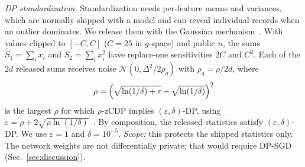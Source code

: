 \textit{DP standardization.} Standardization needs per-feature means and
variances, which are normally shipped with a model and can reveal individual
records when an outlier dominates. We release them with the Gaussian
mechanism~\cite{dwork2014foundations}. With values clipped to $[-C,C]$ ($C=25$ in $g$-space) and public
$n$, the sums $S_1=\sum_i x_i$ and $S_2=\sum_i x_i^2$ have replace-one
sensitivities $2C$ and $C^2$. Each of the $2d$ released sums receives noise
$\mathcal{N}(0,\Delta^2/2\rho_q)$ with $\rho_q=\rho/2d$, where
\begin{equation}
  \rho=\Bigl(\sqrt{\ln(1/\delta)+\varepsilon}-\sqrt{\ln(1/\delta)}\Bigr)^2
  \label{eq:rho}
\end{equation}
is the largest $\rho$ for which $\rho$-zCDP implies
$(\varepsilon,\delta)$-DP, using $\varepsilon=\rho+2\sqrt{\rho\ln(1/\delta)}$~\cite{bun2016zcdp}.
By composition, the released statistics satisfy
$(\varepsilon,\delta)$-DP. We use $\varepsilon=1$ and $\delta=10^{-5}$.
\emph{Scope:} this protects the shipped statistics only. The network
weights are not differentially private; that would require
DP-SGD~\cite{abadi2016dpsgd} (Sec.~\ref{sec:discussion}).

